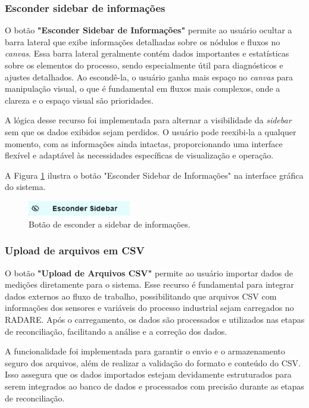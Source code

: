 \subsubsection{Esconder sidebar de informações}

O botão \textbf{"Esconder Sidebar de Informações"} permite ao usuário ocultar a barra lateral que exibe informações detalhadas sobre os nódulos e fluxos no \textit{canvas}. Essa barra lateral geralmente contém dados importantes e estatísticas sobre os elementos do processo, sendo especialmente útil para diagnósticos e ajustes detalhados. Ao escondê-la, o usuário ganha mais espaço no \textit{canvas} para manipulação visual, o que é fundamental em fluxos mais complexos, onde a clareza e o espaço visual são prioridades.

A lógica desse recurso foi implementada para alternar a visibilidade da \textit{sidebar} sem que os dados exibidos sejam perdidos. O usuário pode reexibi-la a qualquer momento, com as informações ainda intactas, proporcionando uma interface flexível e adaptável às necessidades específicas de visualização e operação.

A Figura \ref{Fig:HideSidebarButton} ilustra o botão "Esconder Sidebar de Informações" na interface gráfica do sistema.

\begin{figure}[htbp]
    \centering
    \includegraphics[width=0.4\textwidth]{figuras/hide-sidebar-button.png}
    \caption{Botão de esconder a sidebar de informações.}
    \label{Fig:HideSidebarButton}
\end{figure}

\subsubsection{Upload de arquivos em CSV}

O botão \textbf{"Upload de Arquivos CSV"} permite ao usuário importar dados de medições diretamente para o sistema. Esse recurso é fundamental para integrar dados externos ao fluxo de trabalho, possibilitando que arquivos CSV com informações dos sensores e variáveis do processo industrial sejam carregados no RADARE. Após o carregamento, os dados são processados e utilizados nas etapas de reconciliação, facilitando a análise e a correção dos dados.

A funcionalidade foi implementada para garantir o envio e o armazenamento seguro dos arquivos, além de realizar a validação do formato e conteúdo do CSV. Isso assegura que os dados importados estejam devidamente estruturados para serem integrados ao banco de dados e processados com precisão durante as etapas de reconciliação.

